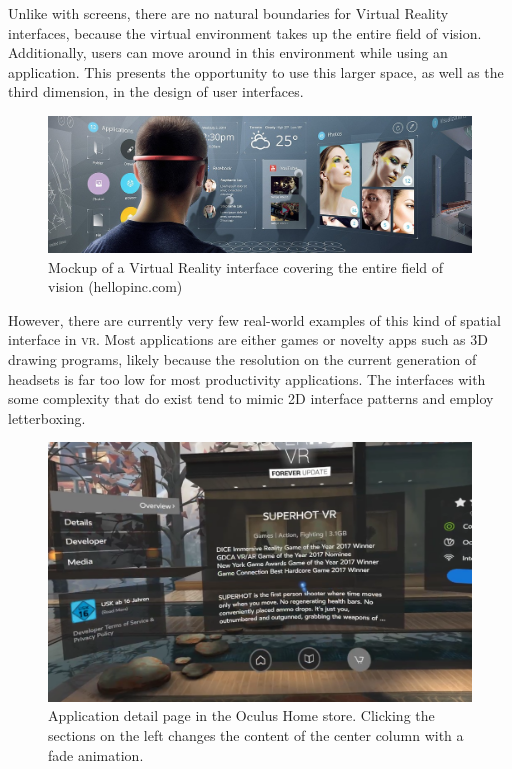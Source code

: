 \documentclass{tufte-book} %
\begin{document}

Unlike with screens, there are no natural boundaries for Virtual Reality interfaces, because the virtual environment takes up the entire field of vision. Additionally, users can move around in this environment while using an application. This presents the opportunity to use this larger space, as well as the third dimension, in the design of user interfaces.

\begin{figure}
  \includegraphics{pinc.jpg}
  \caption{Mockup of a Virtual Reality interface covering the entire field of vision (hellopinc.com)}
  \label{fig:noboundaries}
\end{figure}

However, there are currently very few real-world examples of this kind of spatial interface in \textsc{vr}. Most applications are either games or novelty apps such as 3D drawing programs, likely because the resolution on the current generation of headsets is far too low for most productivity applications.
The interfaces with some complexity that do exist tend to mimic 2D interface patterns and employ letterboxing.

\begin{figure}
  \includegraphics{superhot.png}
  \caption{Application detail page in the Oculus Home store. Clicking the sections on the left changes the content of the center column with a fade animation.}
  \label{fig:superhot}
\end{figure}
\end{document}
